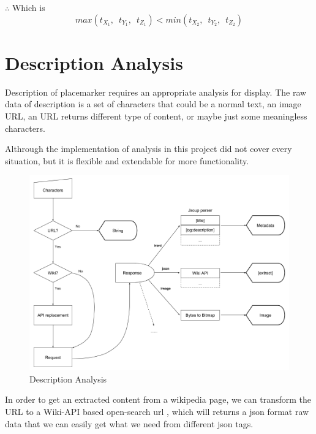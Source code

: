 $\therefore$ Which is
\begin{equation}
\label{equ:ray-box-3d-intersection}
max(t_{X_1},\enspace t_{Y_1},\enspace t_{Z_1}) < min(t_{X_2},\enspace t_{Y_2},\enspace t_{Z_2})
\end{equation}

\section{Description Analysis}

Description of placemarker requires an appropriate analysis for display. The raw data of description is a set of characters that could be a normal text, an image URL, an URL returns different type of content, or maybe just some meaningless characters.

Althrough the implementation of analysis in this project did not cover every situation, but it is flexible and extendable for more functionality.

\begin{figure}[H]
\caption[description-analysis]{Description Analysis}
\label{fig:description-analysis}
\centering
\includegraphics[width=\linewidth]{Figures/description-analysis.png}
\decoRule
\end{figure}

In order to get an extracted content from a wikipedia page, we can transform the URL to a Wiki-API based open-search url \parencite{wiki.api.2016}, which will returns a json format raw data that we can easily get what we need from different json tags.

